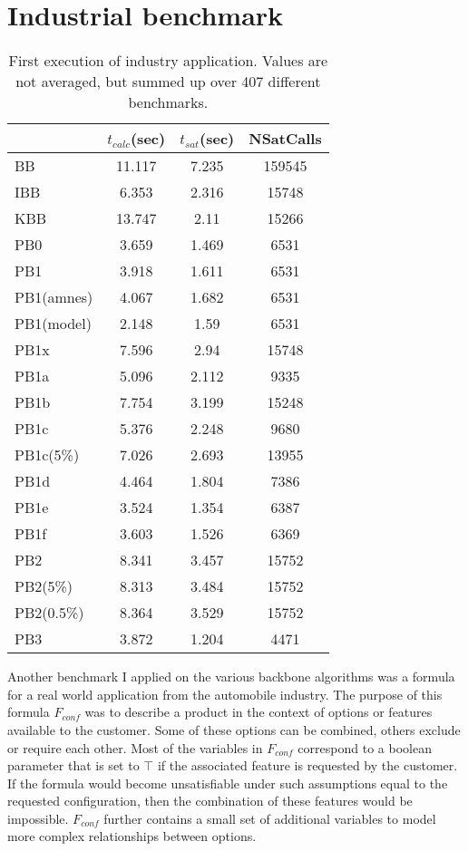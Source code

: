 \section{Industrial benchmark}


\begin{wraptable}{R}{8cm}
\begin{tabular}{l| c c c }
&	$t_{calc}$(sec) &	$t_{sat}$(sec)	& NSatCalls \\
\hline
BB & 11.117 & 7.235 & 159545 \\
IBB & 6.353 & 2.316 & 15748 \\
KBB & 13.747 & 2.11 & 15266 \\
PB0 & 3.659 & 1.469 & 6531 \\
PB1 & 3.918 & 1.611 & 6531 \\
PB1(amnes) & 4.067 & 1.682 & 6531 \\
PB1(model) & 2.148 & 1.59 & 6531 \\
PB1x & 7.596 & 2.94 & 15748 \\
PB1a & 5.096 & 2.112 & 9335 \\
PB1b & 7.754 & 3.199 & 15248 \\
PB1c & 5.376 & 2.248 & 9680 \\
PB1c(5\%) & 7.026 & 2.693 & 13955 \\
PB1d & 4.464 & 1.804 & 7386 \\
PB1e & 3.524 & 1.354 & 6387 \\
PB1f & 3.603 & 1.526 & 6369 \\
PB2 & 8.341 & 3.457 & 15752 \\
PB2(5\%) & 8.313 & 3.484 & 15752 \\
PB2(0.5\%) & 8.364 & 3.529 & 15752 \\
PB3 & 3.872 & 1.204 & 4471 \\
\end{tabular}
\caption{First execution of industry application. Values are not averaged, but summed up over 407 different benchmarks.}
\label{tab:vonThore1} %
\end{wraptable}

Another benchmark I applied on the various backbone algorithms was a formula for a real world application from the automobile industry. The purpose of this formula $F_{conf}$ was to describe a product in the context of options or features available to the customer. Some of these options can be combined, others exclude or require each other. Most of the variables in $F_{conf}$ correspond to a boolean parameter that is set to $\top$ if the associated feature is requested by the customer. If the formula would become unsatisfiable under such assumptions equal to the requested configuration, then the combination of these features would be impossible. $F_{conf}$ further contains a small set of additional variables to model more complex relationships between options.

